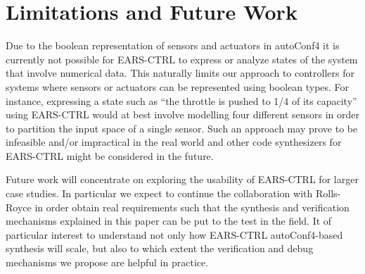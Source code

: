 \section{Limitations and Future Work}
\label{sec:limfuturework}

Due to the boolean representation of sensors and actuators in \textsf{autoConf4}
 it is currently not possible for \textsf{EARS-CTRL} to express or analyze
states of the system that involve numerical data. This naturally limits our
approach to controllers for systems where sensors or actuators can be
represented using boolean types.
For instance, expressing a state such as ``the throttle is pushed to 1/4 of its
capacity'' using \textsf{EARS-CTRL} would at best involve modelling four
different sensors in order to partition the input space of a single sensor. Such
an approach may prove to be infeasible and/or impractical in the real world and
other code synthesizers for \textsf{EARS-CTRL}  might be considered in the
future.

Future work will concentrate on exploring the usability of
\textsf{EARS-CTRL} for larger case studies. In particular we expect to continue
the collaboration with Rolls-Royce in order obtain real requirements such that
the synthesis and verification mechanisms explained in this paper can be put to
the test in the field. It of particular interest to understand not only how
\textsf{EARS-CTRL} \textsf{autoConf4}-based synthesis will scale, but also to
which extent the verification and debug mechanisms we propose are helpful in
practice.
